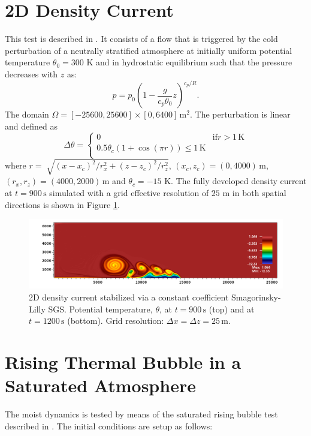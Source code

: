 \documentclass{report}
\begin{document}
{\section{2D Density Current}
This test is described in \cite{strakaWilhelmson1993}. It consists of a flow that is triggered by the cold perturbation of a neutrally stratified atmosphere at initially uniform potential temperature $\theta_0 = 300$ K
and in hydrostatic equilibrium such that the pressure decreases with $z$ as:
\begin{equation}
\label{pressureDistrib2}
p = p_{0}\left(1-\frac{g}{c_p{\theta_{0}}}z\right)^{c_p/R}.
\end{equation}
The domain $\Omega=[-25600,25600]\times[0,6400]\,\mathrm{m}^2$.
The perturbation is linear and defined as
\begin{equation}
 \Delta\theta = \left\{ \begin{array}{ll}
 0 & \mathrm{if } r > 1\,{\mathrm K}\\
 0.5 \theta_c \left(1 + \cos(\pi r) \right) \leq 1\,{\mathrm K}\\
\end{array} \right.
\label{eq:robertIni2}
\end{equation}
where $r = \sqrt[]{(x-x_{c})^2/r_x^{2} + (z-z_{c})^{2}/r_z^2}$, $(x_c,z_c) = (0,4000)\,\mathrm{m}$, $(r_x, r_z) = (4000, 2000)\,\mathrm{m}$ and $\theta_c=-15$ K. The fully developed density current at $t=900\,\mathrm{s}$ simulated with a grid effective resolution of $25$ m in both spatial directions is shown in Figure \ref{fig:benchmarks/dc25msmago}.

\begin{figure}[htbp]
\includegraphics[width=1.2\textwidth]{figures/DC-smgo-25mx25m-900s0000.png}
\caption{2D density current stabilized via a constant coefficient Smagorinsky-Lilly SGS. Potential temperature, $\theta$, at $t=900\,\mathrm{s}$ (top) and at $t=1200\,\mathrm{s}$ (bottom). Grid resolution: $\Delta x = \Delta z = 25\,\mathrm{m}$.
}
\label{fig:benchmarks/dc25msmago}
\end{figure}


\section{Rising Thermal Bubble in a Saturated Atmosphere}
\label{rtb3D}
The moist dynamics is tested by means of the saturated rising bubble test described in \cite{Pressel15a}. The initial conditions are setup as follows:

}
\end{document}
